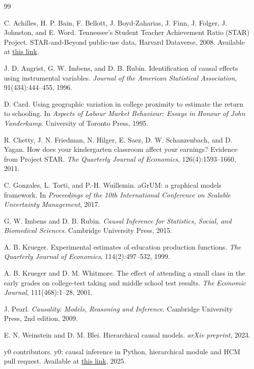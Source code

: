 \documentclass[unnumsec,webpdf,contemporary,large]{oup-authoring-template}%
\theoremstyle{thmstyleone}%
\theoremstyle{thmstyletwo}%
\theoremstyle{thmstylethree}%
\begin{document}
\begin{thebibliography}{99}

C. Achilles, H. P. Bain, F. Bellott, J. Boyd-Zaharias, J. Finn, J. Folger, J. Johnston, and E. Word.
\newblock Tennessee's Student Teacher Achievement Ratio (STAR) Project.
\newblock STAR-and-Beyond public-use data, Harvard Dataverse, 2008.
\newblock Available at \href{https://doi.org/10.7910/DVN/SIWH9F}{this link}.

J. D. Angrist, G. W. Imbens, and D. B. Rubin.
\newblock Identification of causal effects using instrumental variables.
\newblock \emph{Journal of the American Statistical Association}, 91(434):444--455, 1996.

D. Card.
\newblock Using geographic variation in college proximity to estimate the return to schooling.
\newblock In \emph{Aspects of Labour Market Behaviour: Essays in Honour of John Vanderkamp}. University of Toronto Press, 1995.

R. Chetty, J. N. Friedman, N. Hilger, E. Saez, D. W. Schanzenbach, and D. Yagan.
\newblock How does your kindergarten classroom affect your earnings? Evidence from Project STAR.
\newblock \emph{The Quarterly Journal of Economics}, 126(4):1593--1660, 2011.

C. Gonzales, L. Torti, and P.-H. Wuillemin.
\newblock aGrUM: a graphical models framework.
\newblock In \emph{Proceedings of the 10th International Conference on Scalable Uncertainty Management}, 2017.

G. W. Imbens and D. B. Rubin.
\newblock \emph{Causal Inference for Statistics, Social, and Biomedical Sciences}.
\newblock Cambridge University Press, 2015.

A. B. Krueger.
\newblock Experimental estimates of education production functions.
\newblock \emph{The Quarterly Journal of Economics}, 114(2):497--532, 1999.

A. B. Krueger and D. M. Whitmore.
\newblock The effect of attending a small class in the early grades on college-test taking and middle school test results.
\newblock \emph{The Economic Journal}, 111(468):1--28, 2001.

J. Pearl.
\newblock \emph{Causality: Models, Reasoning and Inference}.
\newblock Cambridge University Press, 2nd edition, 2009.

E. N. Weinstein and D. M. Blei.
\newblock Hierarchical causal models.
\newblock \emph{arXiv preprint}, 2023.

y0 contributors.
\newblock y0: causal inference in Python, hierarchical module and HCM pull request.
\newblock Available at \href{https://github.com/y0-causal-inference/y0}{this link}, 2025.

\end{thebibliography}
\end{document}
